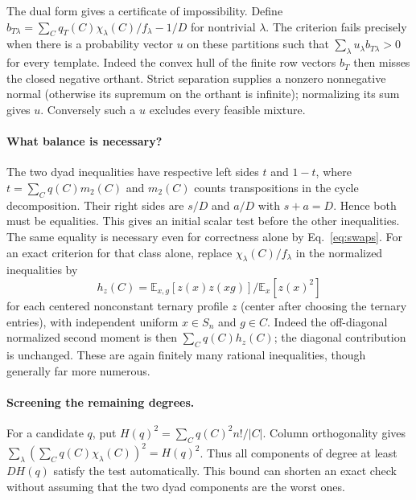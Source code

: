 The dual form gives a certificate of impossibility. Define
$b_{T\lambda}=\sum_Cq_T(C)\chi_\lambda(C)/f_\lambda-1/D$ for
nontrivial $\lambda$. The criterion fails precisely when there is a
probability vector $u$ on these partitions such that
$\sum_\lambda u_\lambda b_{T\lambda}>0$ for every template.
Indeed the convex hull of the finite row vectors $b_T$ then misses
the closed negative orthant. Strict separation supplies a nonzero
nonnegative normal (otherwise its supremum on the orthant is infinite);
normalizing its sum gives $u$. Conversely such a $u$ excludes every
feasible mixture.

\paragraph{What balance is necessary?}
The two dyad inequalities have respective left sides $t$ and $1-t$,
where $t=\sum_Cq(C)m_2(C)$ and $m_2(C)$ counts transpositions in the
cycle decomposition. Their right sides are $s/D$ and $a/D$ with
$s+a=D$. Hence both must be equalities. This gives an initial scalar
test before the other inequalities. The same equality is necessary
even for correctness alone by Eq.~\eqref{eq:swaps}. For an exact
criterion for that class alone, replace $\chi_\lambda(C)/f_\lambda$
in the normalized inequalities by
\[
 h_z(C)=\mathbb E_{x,g}[z(x)z(xg)]/\mathbb E_x[z(x)^2]
\]
for each centered nonconstant ternary profile $z$ (center after
choosing the ternary entries), with independent uniform $x\in S_n$
and $g\in C$. Indeed the off-diagonal normalized second moment is
then $\sum_Cq(C)h_z(C)$; the diagonal contribution is unchanged.
These are again finitely many rational inequalities, though generally
far more numerous.

\paragraph{Screening the remaining degrees.}
For a candidate $q$, put $H(q)^2=\sum_C q(C)^2 n!/|C|$.
Column orthogonality gives
$\sum_\lambda(\sum_Cq(C)\chi_\lambda(C))^2=H(q)^2$.
Thus all components of degree at least $DH(q)$ satisfy the test
automatically. This bound can shorten an exact check without
assuming that the two dyad components are the worst ones.

